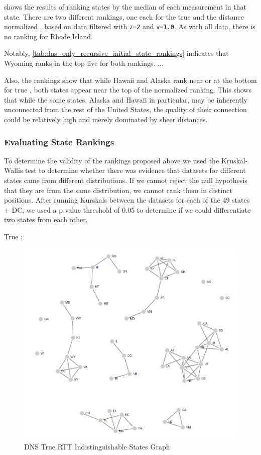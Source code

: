  shows the results of ranking states by the median of each measurement in that state. There are two different rankings, one each for the true \rtt and the distance normalized \rtt, based on data filtered with \texttt{z=2} and \texttt{v=1.0}. As with all \dns data, there is no ranking for Rhode Island.



Notably, \cref{tab:dns_only_recursive_initial_state_rankings} indicates that Wyoming ranks in the top five for both rankings. ...

Also, the rankings show that while Hawaii and Alaska rank near or at the bottom for true \rtt, both states appear near the top of the normalized ranking. This shows that while the some states, Alaska and Hawaii in particular, may be inherently unconnected from the rest of the United States, the quality of their connection could be relatively high and merely dominated by sheer distances.

\subsubsection{Evaluating State Rankings}

To determine the validity of the rankings proposed above we used the Kruskal-Wallis test to determine whether there was evidence that datasets for different states came from different distributions. If we cannot reject the null hypothesis that they are from the same distribution, we cannot rank them in distinct positions. After running Kurskals between the datasets for each of the 49 states + DC, we used a p value threshold of 0.05 to determine if we could differentiate two states from each other. 

True \rtt:
\begin{figure}[H]
    \centering
    \includegraphics[width=\textwidth]{images/dns/kruskals_analysis_no_auth_agg/rtt/graph.png}
    \caption{DNS True RTT Indistinguishable States Graph}
    \label{fig:dns_true_rtt_indistinguishable_states_graph}
\end{figure}

